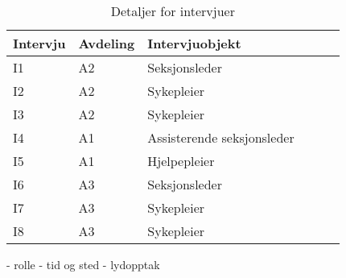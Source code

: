 \begin{table}[H]\centering
    \begin{tabular}{ |l|l|l|l|l|l| }
    \hline
    Intervju & Avdeling & Intervjuobjekt \\ \hline
       I1 & A2 & Seksjonsleder \\ \hline
       I2 & A2 & Sykepleier \\ \hline
       I3 & A2 & Sykepleier \\ \hline
       I4 & A1 & Assisterende seksjonsleder \\ \hline
       I5 & A1 & Hjelpepleier \\ \hline
       I6 & A3 & Seksjonsleder \\ \hline
       I7 & A3 & Sykepleier \\ \hline
       I8 & A3 & Sykepleier \\ \hline
    \end{tabular}
    \caption {Detaljer for intervjuer}
    \label{detaljerintervju}
\end{table}
 






- rolle
- tid og sted
- lydopptak
